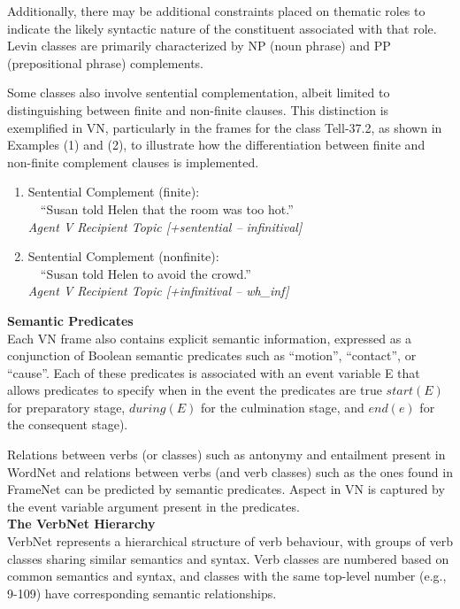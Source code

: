 Additionally, there may be additional constraints placed on thematic roles to indicate the likely syntactic nature of the constituent associated with that role.
Levin classes are primarily characterized by NP (noun phrase) and PP (prepositional phrase) complements. 

Some classes also involve sentential complementation, albeit limited to distinguishing between finite and non-finite clauses. This distinction is exemplified in VN, particularly in the frames for the class Tell-37.2, as shown in Examples (1) and (2), to illustrate how the differentiation between finite and non-finite complement clauses is implemented.
\begin{enumerate}
\item Sentential Complement (ﬁnite): \\ \ \ \enquote{Susan told Helen that the room was too hot.} \\ \emph{Agent V Recipient Topic [+sentential – infinitival]}
\item Sentential Complement (nonﬁnite): \\ \ \  \enquote{Susan told Helen to avoid the crowd.}\\ \emph{Agent V Recipient Topic [+inﬁnitival – wh\_inf]}
\end{enumerate}
\textbf{Semantic Predicates}\\ 
Each VN frame also contains explicit semantic information, expressed as a conjunction of Boolean semantic predicates such as \enquote{motion}, \enquote{contact}, or \enquote{cause}. Each of these predicates is associated with an event variable E that allows predicates to specify when in the event the predicates are true $start(E)$ for preparatory stage, $during(E)$ for the culmination stage, and $end(e)$ for the consequent stage). 

Relations between verbs (or classes) such as antonymy and entailment present in WordNet and relations between verbs (and verb classes) such as the ones found in FrameNet can be predicted by semantic predicates. Aspect in VN is captured by the event variable argument present in the predicates.\\ 
\textbf{The VerbNet Hierarchy}\\ 
VerbNet represents a hierarchical structure of verb behaviour, with groups of verb classes sharing similar semantics and syntax. Verb classes are numbered based on common semantics and syntax, and classes with the same top-level number (e.g., 9-109) have corresponding semantic relationships. 

